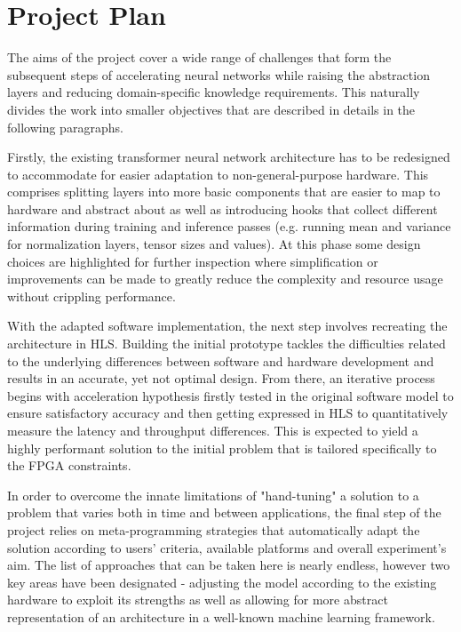 \chapter{Project Plan}\label{project-plan}

The aims of the project cover a wide range of challenges that form the subsequent steps of accelerating neural networks while raising the abstraction layers and reducing domain-specific knowledge requirements. This naturally divides the work into smaller objectives that are described in details in the following paragraphs.

Firstly, the existing transformer neural network architecture has to be redesigned to accommodate for easier adaptation to non-general-purpose hardware. This comprises splitting layers into more basic components that are easier to map to hardware and abstract about as well as introducing hooks that collect different information during training and inference passes (e.g. running mean and variance for normalization layers, tensor sizes and values). At this phase some design choices are highlighted for further inspection where simplification or improvements can be made to greatly reduce the complexity and resource usage without crippling performance.

With the adapted software implementation, the next step involves recreating the architecture in HLS. Building the initial prototype tackles the difficulties related to the underlying differences between software and hardware development and results in an accurate, yet not optimal design. From there, an iterative process begins with acceleration hypothesis firstly tested in the original software model to ensure satisfactory accuracy and then getting expressed in HLS to quantitatively measure the latency and throughput differences. This is expected to yield a highly performant solution to the initial problem that is tailored specifically to the FPGA constraints.

In order to overcome the innate limitations of "hand-tuning" a solution to a problem that varies both in time and between applications, the final step of the project relies on meta-programming strategies that automatically adapt the solution according to users' criteria, available platforms and overall experiment's aim. The list of approaches that can be taken here is nearly endless, however two key areas have been designated - adjusting the model according to the existing hardware to exploit its strengths as well as allowing for more abstract representation of an architecture in a well-known machine learning framework.

